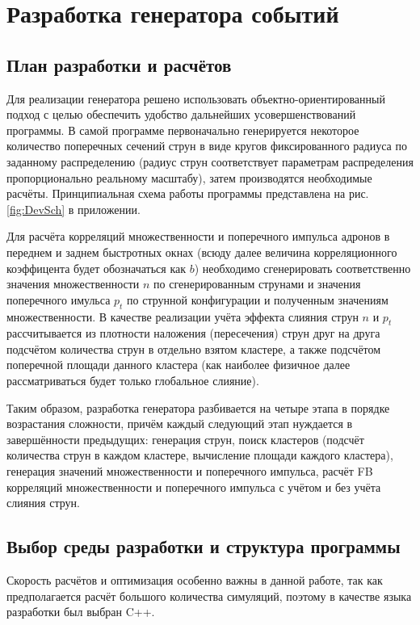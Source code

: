 \section{Разработка генератора событий}
\subsection{План разработки и расчётов}
Для реализации генератора решено использовать объектно-ориентированный подход с целью обеспечить удобство дальнейших усовершенствований программы. 
В самой программе первоначально генерируется некоторое количество поперечных сечений струн в виде кругов фиксированного радиуса по заданному распределению (радиус струн соответствует параметрам распределения пропорционально реальному масштабу), затем производятся необходимые расчёты. Принципиальная схема работы программы представлена на рис. \ref{fig:DevSch} в приложении.

Для расчёта корреляций множественности и поперечного импульса адронов в переднем и заднем быстротных окнах (всюду далее величина корреляционного коэффицента будет обозначаться как $b$) необходимо сгенерировать соответственно значения множественности $n$ по сгенерированным струнами и значения поперечного имульса $p_t$ по струнной конфигурации и полученным значениям множественности. В качестве реализации учёта эффекта слияния струн $n$ и $p_t$ рассчитывается из плотности наложения (пересечения) струн друг на друга подсчётом количества струн в отдельно взятом кластере, а также подсчётом поперечной площади данного кластера (как наиболее физичное далее рассматриваться будет только глобальное слияние). 

Таким образом, разработка генератора разбивается на четыре этапа в порядке возрастания сложности, причём каждый следующий этап нуждается в завершённости предыдущих: генерация струн, поиск кластеров (подсчёт количества струн в каждом кластере, вычисление площади каждого кластера), генерация значений множественности и поперечного импульса, расчёт FB корреляций множественности и поперечного импульса с учётом и без учёта слияния струн.
\subsection{Выбор среды разработки и структура программы}
Скорость расчётов и оптимизация особенно важны в данной работе, так как предполагается расчёт большого количества симуляций, поэтому в качестве языка разработки был выбран C++. 

